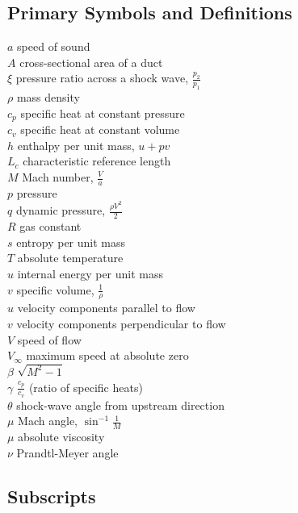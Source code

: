 \subsection*{Primary Symbols and Definitions}

\begin{multicols}{2}
\noindent$a$ \quad speed of sound \\
$A$ \quad cross-sectional area of a duct \\
$\xi$ \quad pressure ratio across a shock wave, $ \frac{p_2}{p_1} $ \\
$\rho$ \quad mass density \\
$c_p$ \quad specific heat at constant pressure \\
$c_v$ \quad specific heat at constant volume \\
$h$ \quad enthalpy per unit mass, $ u + pv $ \\
$L_c$ \quad characteristic reference length \\
$M$ \quad Mach number, $ \frac{V}{a} $ \\
$p$ \quad pressure \\
$q$ \quad dynamic pressure, $ \frac{\rho V^2}{2} $ \\
$R$ \quad gas constant \\
$s$ \quad entropy per unit mass \\
$T$ \quad absolute temperature \\
$u$ \quad internal energy per unit mass \\
$v$ \quad specific volume, $ \frac{1}{\rho} $ \\
$u$ \quad velocity components parallel to flow \\
$v$ \quad velocity components perpendicular to flow \\
$V$ \quad speed of flow \\
$V_\infty$ \quad maximum speed at absolute zero\\
$\beta$ \quad $ \sqrt{M^2 - 1} $ \\
$\gamma$ \quad $ \frac{c_p}{c_v} $ (ratio of specific heats) \\
$\theta$ \quad shock-wave angle from upstream direction \\
$\mu$ \quad Mach angle, $ \sin^{-1} \frac{1}{M} $ \\
$\mu$ \quad absolute viscosity \\
$\nu$ \quad Prandtl-Meyer angle \\
\end{multicols}

\subsection*{Subscripts}

